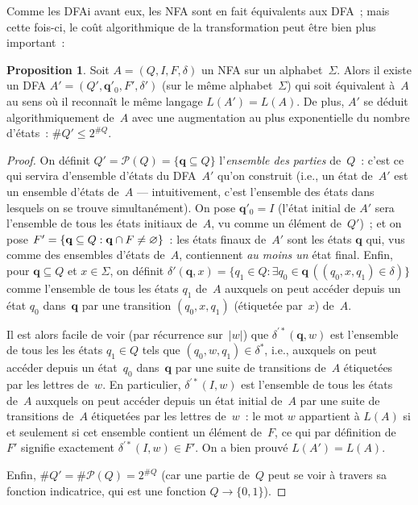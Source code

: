 \documentclass[12pt,a4paper]{article}
\theoremstyle{definition}
\newtheorem{prop}[comcnt]{Proposition}
\begin{document}
\bigbreak

Comme les DFAi avant eux, les NFA sont en fait équivalents aux DFA ;
mais cette fois-ci, le coût algorithmique de la transformation peut
être bien plus important :

\begin{prop}\label{determinization-of-nfa}
Soit $A = (Q,I,F,\delta)$ un NFA sur un alphabet $\Sigma$.  Alors il
existe un DFA $A' = (Q',\textbf{q}'_0,F',\delta')$ (sur le même
alphabet $\Sigma$) qui soit équivalent à $A$ au sens où il reconnaît
le même langage $L(A') = L(A)$.  De plus, $A'$ se déduit
algorithmiquement de $A$ avec une augmentation au plus exponentielle
du nombre d'états : $\#Q' \leq 2^{\#Q}$.
\end{prop}
\begin{proof}
On définit $Q' = \mathscr{P}(Q) = \{\mathbf{q} \subseteq Q\}$
l'\emph{ensemble des parties} de $Q$ : c'est ce qui servira d'ensemble
d'états du DFA $A'$ qu'on construit (i.e., un état de $A'$ est un
ensemble d'états de $A$ — intuitivement, c'est l'ensemble des états
dans lesquels on se trouve simultanément).  On pose $\textbf{q}'_0 = I$ (l'état
initial de $A'$ sera l'ensemble de tous les états initiaux de $A$, vu
comme un élément de $Q'$) ; et on pose $F' = \{\mathbf{q}\subseteq Q
:\penalty-100 \mathbf{q}\cap F \neq\varnothing\}$ : les états finaux
de $A'$ sont les états $\mathbf{q}$ qui, vus comme des ensembles
d'états de $A$, contiennent \emph{au moins un} état final.  Enfin,
pour $\mathbf{q}\subseteq Q$ et $x \in \Sigma$, on définit
$\delta'(\mathbf{q},x) = \{q_1\in Q : \exists q_0\in\mathbf{q}\,
((q_0,x,q_1) \in \delta)\}$ comme l'ensemble de tous les états $q_1$
de $A$ auxquels on peut accéder depuis un état $q_0$ dans $\mathbf{q}$
par une transition $(q_0,x,q_1)$ (étiquetée par $x$) de $A$.

Il est alors facile de voir (par récurrence sur $|w|$) que
$\delta^{\prime*}(\mathbf{q},w)$ est l'ensemble de tous les les états
$q_1 \in Q$ tels que $(q_0,w,q_1)\in\delta^*$, i.e., auxquels on peut
accéder depuis un état $q_0$ dans $\mathbf{q}$ par une suite de
transitions de $A$ étiquetées par les lettres de $w$.  En particulier,
$\delta^{\prime*}(I,w)$ est l'ensemble de tous les états de $A$
auxquels on peut accéder depuis un état initial de $A$ par une suite
de transitions de $A$ étiquetées par les lettres de $w$ : le mot $w$
appartient à $L(A)$ si et seulement si cet ensemble contient un élément
de $F$, ce qui par définition de $F'$ signifie exactement
$\delta^{\prime*}(I,w) \in F'$.  On a bien prouvé $L(A') = L(A)$.

Enfin, $\#Q' = \#\mathscr{P}(Q) = 2^{\#Q}$ (car une partie de $Q$ peut
se voir à travers sa fonction indicatrice, qui est une fonction $Q \to
\{0,1\}$).
\end{proof}
\end{document}
